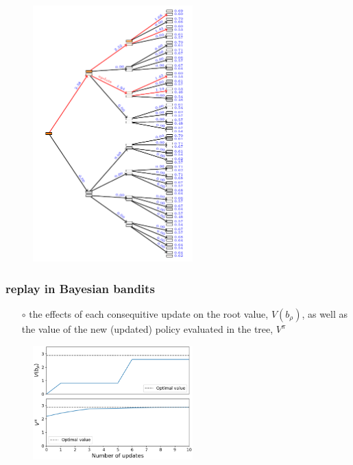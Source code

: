 \documentclass[aspectratio=169]{beamer}
\begin{document}
\begin{landscape}
    \begin{frame}
        \begin{figure}
            \includegraphics[width=0.55\textwidth]{trees/1/tex_tree_10.pdf}
        \end{figure}
    \end{frame}
\end{landscape}

\begin{frame}
    \frametitle{replay in Bayesian bandits}
    \begin{itemize}
        \item[$\circ$] the effects of each consequitive update on the root value, $V(b_\rho)$, as well 
        as the value of the new (updated) policy evaluated in the tree, $V^\pi$   
    \end{itemize}
    \begin{figure}
        \centering
        \includegraphics[width=0.55\textwidth]{trees/1/root_values.png}
    \end{figure}
\end{frame}
\end{document}
